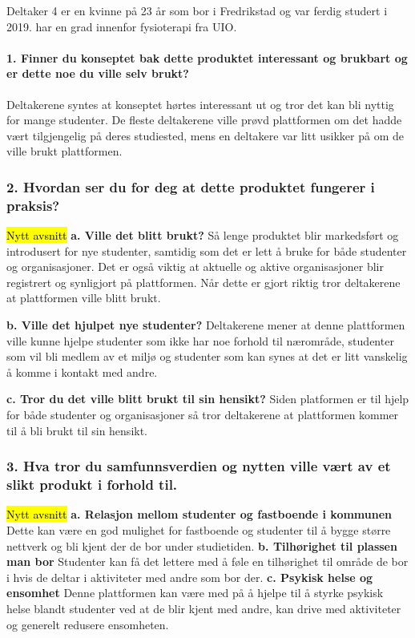 Deltaker 4 er en kvinne på 23 år som bor i Fredrikstad og var ferdig studert i 2019. har en grad innenfor fysioterapi fra UIO.
\paragraph{1. Finner du konseptet bak dette produktet interessant og brukbart og er dette noe du ville selv brukt?}
Deltakerene syntes at konseptet hørtes interessant ut og tror det kan bli nyttig for mange studenter. De fleste deltakerene ville prøvd plattformen om det hadde vært tilgjengelig på deres studiested, mens en deltakere var litt usikker på om de ville brukt plattformen.

\subsubsection{2. Hvordan ser du for deg at dette produktet fungerer i praksis?}
\hl{Nytt avsnitt}
{\bf a. Ville det blitt brukt?}
Så lenge produktet blir markedsført og introdusert for nye studenter, samtidig som det er lett å bruke for både studenter og organisasjoner. Det er også viktig at aktuelle og aktive organisasjoner blir registrert og synligjort på plattformen. Når dette er gjort riktig tror deltakerene at plattformen ville blitt brukt. 

{\bf b. Ville det hjulpet nye studenter?}
Deltakerene mener at denne plattformen ville kunne hjelpe studenter som ikke har noe forhold til nærområde, studenter som vil bli medlem av et miljø og studenter som kan synes at det er litt vanskelig å komme i kontakt med andre.

{\bf c. Tror du det ville blitt brukt til sin hensikt?}
Siden platformen er til hjelp for både studenter og organisasjoner så tror deltakerene at plattformen kommer til å bli brukt til sin hensikt.

\subsubsection{3. Hva tror du samfunnsverdien og nytten ville vært av et slikt produkt i forhold til.}
\hl{Nytt avsnitt}
{\bf a. Relasjon mellom studenter og fastboende i kommunen}
Dette kan være en god mulighet for fastboende og studenter til å bygge større nettverk og bli kjent der de bor under studietiden.
{\bf b. Tilhørighet til plassen man bor}
Studenter kan få det lettere med å føle en tilhørighet til område de bor i hvis de deltar i aktiviteter med andre som bor der.
{\bf c. Psykisk helse og ensomhet}
Denne plattformen kan være med på å hjelpe til å styrke psykisk helse blandt studenter ved at de blir kjent med andre, kan drive med aktiviteter og generelt redusere ensomheten.
